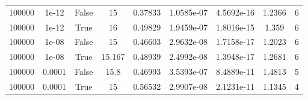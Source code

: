 \begin{table}
\begin{tabular}{ccccccccc}
100000 & 1e-12 & False & 15 & 0.37833 & 1.0585e-07 & 4.5692e-16 & 1.2366 & 6 \\
100000 & 1e-12 & True & 16 & 0.49829 & 1.9459e-07 & 1.8016e-15 & 1.359 & 6 \\
100000 & 1e-08 & False & 15 & 0.46603 & 2.9632e-08 & 1.7158e-17 & 1.2023 & 6 \\
100000 & 1e-08 & True & 15.167 & 0.48939 & 2.4992e-08 & 1.3948e-17 & 1.2681 & 6 \\
100000 & 0.0001 & False & 15.8 & 0.46993 & 3.5393e-07 & 8.4889e-11 & 1.4813 & 5 \\
100000 & 0.0001 & True & 15 & 0.56532 & 2.9907e-08 & 2.1231e-11 & 1.1345 & 4 \\
\bottomrule
\end{tabular}
\end{table}
